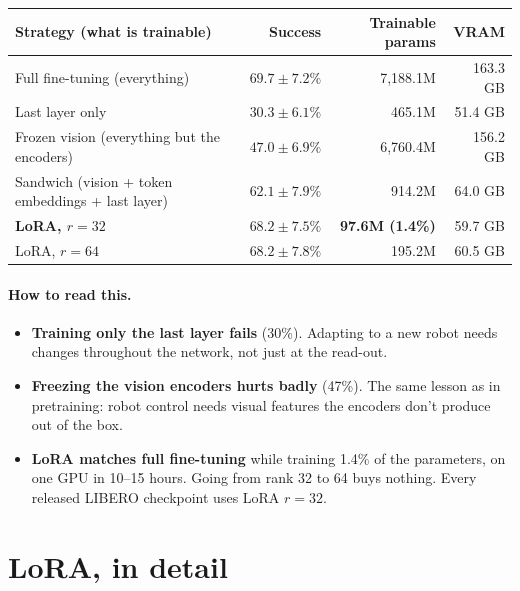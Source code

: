 \documentclass[11pt]{article}
\begin{document}
\begin{center}
\begin{tabular}{@{}lrrr@{}}
\toprule
Strategy (what is trainable) & Success & Trainable params & VRAM \\
\midrule
Full fine-tuning (everything) & $69.7\pm7.2\%$ & 7{,}188.1M & 163.3 GB \\
Last layer only & $30.3\pm6.1\%$ & 465.1M & 51.4 GB \\
Frozen vision (everything but the encoders) & $47.0\pm6.9\%$ & 6{,}760.4M & 156.2 GB \\
Sandwich (vision + token embeddings + last layer) & $62.1\pm7.9\%$ & 914.2M & 64.0 GB \\
\textbf{LoRA, $r=32$} & $\mathbf{68.2\pm7.5\%}$ & \textbf{97.6M (1.4\%)} & 59.7 GB \\
LoRA, $r=64$ & $68.2\pm7.8\%$ & 195.2M & 60.5 GB \\
\bottomrule
\end{tabular}
\end{center}

\paragraph{How to read this.}
\begin{itemize}
  \item \textbf{Training only the last layer fails} (30\%). Adapting to a new robot needs changes throughout the network, not just at the read-out.
  \item \textbf{Freezing the vision encoders hurts badly} (47\%). The same lesson as in pretraining: robot control needs visual features the encoders don't produce out of the box.
  \item \textbf{LoRA matches full fine-tuning} while training 1.4\% of the parameters, on one GPU in 10--15 hours. Going from rank 32 to 64 buys nothing. Every released LIBERO checkpoint uses LoRA $r=32$.
\end{itemize}

\section{LoRA, in detail}
\end{document}
